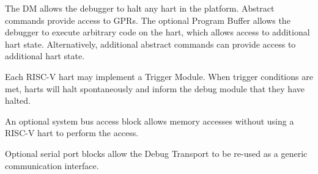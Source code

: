 The DM allows the debugger to halt any hart in the platform. Abstract commands
provide access to GPRs.
The optional Program Buffer allows the debugger to execute arbitrary code on the hart,
which allows access to additional hart state. Alternatively, additional
abstract commands can provide access to additional hart state.

Each RISC-V hart may implement a Trigger Module. When trigger conditions
are met, harts will halt spontaneously and inform the debug module that they have
halted.

An optional system bus access block allows memory accesses without using a
RISC-V hart to perform the access.

Optional serial port blocks allow the Debug Transport to be re-used as a
generic communication interface.
